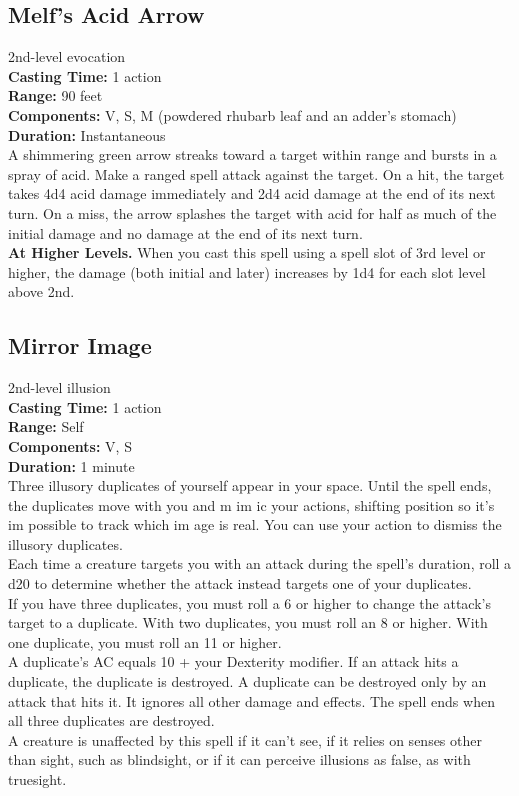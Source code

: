 \documentclass[11pt, A4paper, english]{article}
\begin{document}
		\subsection{Melf's Acid Arrow}
2nd-level evocation \\
\textbf{Casting Time:} 1 action \\
\textbf{Range:} 90 feet \\
\textbf{Components:} V, S, M (powdered rhubarb leaf and an adder’s stomach) \\
\textbf{Duration:} Instantaneous \\
A shimmering green arrow streaks toward a target within range and bursts in a spray of acid. Make a ranged spell attack against the target. On a hit, the target takes 4d4 acid damage immediately and 2d4 acid damage at the end of its next turn. On a miss, the arrow splashes the target with acid for half as much of the initial damage and no damage at the end of its next turn. \\
\textbf{At Higher Levels.} When you cast this spell using a spell slot of 3rd level or higher, the damage (both initial and later) increases by 1d4 for each slot level above 2nd.

		\subsection{Mirror Image}
2nd-level illusion \\
\textbf{Casting Time:} 1 action \\
\textbf{Range:} Self \\
\textbf{Components:} V, S \\
\textbf{Duration:} 1 minute \\
Three illusory duplicates of yourself appear in your space. Until the spell ends, the duplicates move with you and m im ic your actions, shifting position so it’s im possible to track which im age is real. You can use your action to dismiss the illusory duplicates. \\
Each time a creature targets you with an attack during the spell’s duration, roll a d20 to determine whether the attack instead targets one of your duplicates. \\
If you have three duplicates, you must roll a 6 or higher to change the attack’s target to a duplicate. With two duplicates, you must roll an 8 or higher. With one duplicate, you must roll an 11 or higher. \\
A duplicate’s AC equals 10 + your Dexterity modifier. If an attack hits a duplicate, the duplicate is destroyed. A duplicate can be destroyed only by an attack that hits it. It ignores all other damage and effects. The spell ends when all three duplicates are destroyed. \\
A creature is unaffected by this spell if it can’t see, if it relies on senses other than sight, such as blindsight, or if it can perceive illusions as false, as with truesight.
\end{document}
